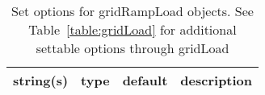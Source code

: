 \begin{table}[ht]
\centering
\begin{tabular}{p{5cm} c c p{7cm}}
\hline
string(s) & type & default & description \\
\hline
\hline
\end{tabular}
\caption{Set options for gridRampLoad objects. See Table~\ref{table:gridLoad} for additional settable options through gridLoad}
\label{table:gridRampLoad}
\end{table}

